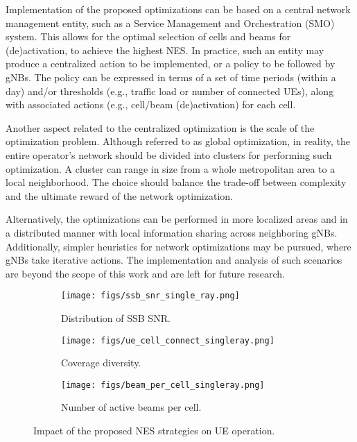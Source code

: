 Implementation of the proposed optimizations can be based on a central network management entity, such as a Service Management and Orchestration (SMO) system. This allows for the optimal selection of cells and beams for (de)activation, to achieve the highest NES. 
In practice, such an entity may produce a centralized action to be implemented, or a policy to be followed by gNBs. The policy can be expressed in terms of a set of time periods (within a day) and/or thresholds (e.g., traffic load or number of connected UEs), along with associated actions (e.g., cell/beam (de)activation) for each cell.

Another aspect related to the centralized optimization is the scale of the optimization problem. Although referred to as global optimization, in reality, the entire operator's network should be divided into clusters for performing such optimization. A cluster can range in size from a whole metropolitan area to a local neighborhood. The choice should balance the trade-off between complexity and the ultimate reward of the network optimization.

Alternatively, the optimizations can be performed in more localized areas and in a distributed manner with local information sharing across neighboring gNBs. Additionally, simpler heuristics for network optimizations may be pursued, where gNBs take iterative actions. The implementation and analysis of such scenarios are beyond the scope of this work and are left for future research.
\begin{figure*}%
\centering
\begin{subfigure}[b]{0.325\linewidth}
    \texttt{[image: figs/ssb\_snr\_single\_ray.png]}
    \caption{Distribution of SSB SNR.}
    \label{fig:dl_ssb_snr}
\end{subfigure}
\begin{subfigure}[b]{0.325\linewidth}
    \texttt{[image: figs/ue\_cell\_connect\_singleray.png]}
    \caption{Coverage diversity.}
    \label{fig:coverage_div}
\end{subfigure}
\begin{subfigure}[b]{0.325\linewidth}
    \texttt{[image: figs/beam\_per\_cell\_singleray.png]}
    \caption{Number of active beams per cell.}
    \label{fig:beam_per_sector}
\end{subfigure}
\caption{Impact of the proposed NES strategies on UE operation.}
\label{fig:UE_imapct}
\vspace{-15pt}
\end{figure*}


